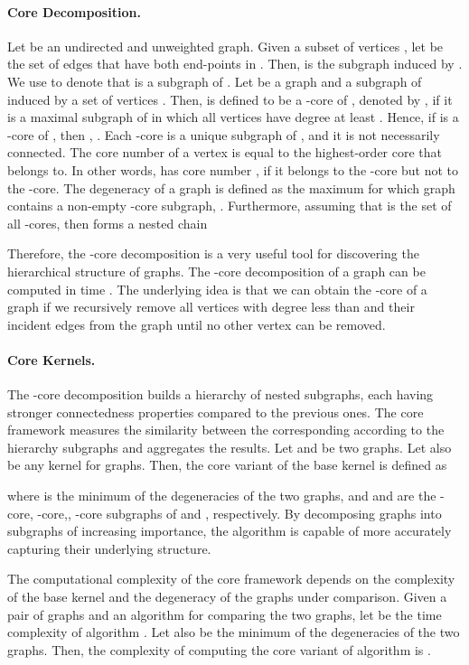 \documentclass[twoside,11pt]{article}
\begin{document}
\paragraph{Core Decomposition.}
Let  be an undirected and unweighted graph.
Given a subset of vertices , let  be the set of edges that have both end-points in .
Then,  is the subgraph induced by .
We use  to denote that  is a subgraph of .
Let  be a graph and  a subgraph of  induced by a set of vertices .
Then,  is defined to be a -core of , denoted by , if it is a maximal subgraph of  in which all vertices have degree at least .
Hence, if  is a -core of , then , .
Each -core is a unique subgraph of , and it is not necessarily connected.
The core number  of a vertex  is equal to the highest-order core that  belongs to.
In other words,  has core number , if it belongs to the -core but not to the -core.
The degeneracy  of a graph  is defined as the maximum  for which graph  contains a non-empty -core subgraph, .
Furthermore, assuming that  is the set of all -cores, then  forms a nested chain

Therefore, the -core decomposition is a very useful tool for discovering the hierarchical structure of graphs.
The -core decomposition of a graph can be computed in  time . 
The underlying idea is that we can obtain the -core of a graph if we recursively remove all vertices with degree less than  and their incident edges from the graph until no other vertex can be removed.

\paragraph{Core Kernels.}
The -core decomposition builds a hierarchy of nested subgraphs, each having stronger connectedness properties compared to the previous ones.
The core framework measures the similarity between the corresponding according to the hierarchy subgraphs and aggregates the results.
Let  and  be two graphs.
Let also  be any kernel for graphs.
Then, the core variant of the base kernel  is defined as

where  is the minimum of the degeneracies of the two graphs, and  and  are the -core, -core,, -core subgraphs of  and , respectively.
By decomposing graphs into subgraphs of increasing importance, the algorithm is capable of more accurately capturing their underlying structure.

The computational complexity of the core framework depends on the complexity of the base kernel and the degeneracy of the graphs under comparison.
Given a pair of graphs  and an algorithm  for comparing the two graphs, let  be the time complexity of algorithm .
Let also  be the minimum of the degeneracies of the two graphs.
Then, the complexity of computing the core variant of algorithm  is .
\end{document}
